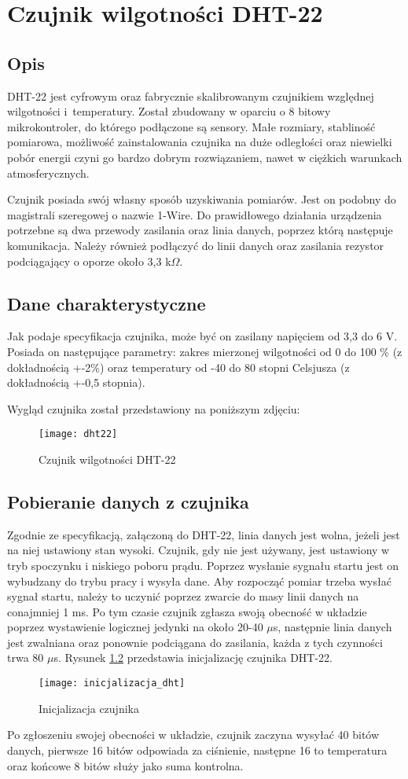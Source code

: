 \chapter{Czujnik wilgotności DHT-22}
\section*{Opis}
DHT-22 jest cyfrowym oraz fabrycznie skalibrowanym czujnikiem względnej wilgotności i~temperatury. Został zbudowany w oparciu o 8 bitowy mikrokontroler, do którego podłączone są sensory. Małe rozmiary, stabliność pomiarowa, możliwość zainstalowania czujnika na duże odległości oraz niewielki pobór energii czyni go bardzo dobrym rozwiązaniem, nawet w ciężkich warunkach atmosferycznych.

Czujnik posiada swój własny sposób uzyskiwania pomiarów. Jest on podobny do magistrali szeregowej o nazwie 1-Wire. Do prawidłowego działania urządzenia potrzebne są dwa przewody zasilania oraz linia danych, poprzez którą następuje komunikacja. Należy również podłączyć do linii danych oraz zasilania rezystor podciągający o oporze około 3,3 k$\Omega$.
\section*{Dane charakterystyczne}
Jak podaje specyfikacja czujnika, może być on zasilany napięciem od 3,3 do 6 V. Posiada on następujące parametry: zakres mierzonej wilgotności od 0 do 100 \% (z dokładnością +-2\%) oraz temperatury od -40 do 80 stopni Celsjusza (z dokładnością +-0,5 stopnia).

Wygląd czujnika został przedstawiony na poniższym zdjęciu:
\begin{figure}[h]
\centering
\texttt{[image: dht22]}
\caption{Czujnik wilgotności DHT-22}
\label{fig:dht22}
\end{figure}
\section*{Pobieranie danych z czujnika}
Zgodnie ze specyfikacją, załączoną do DHT-22, linia danych jest wolna, jeżeli jest na niej ustawiony stan wysoki. Czujnik, gdy nie jest używany, jest ustawiony w tryb spoczynku i niskiego poboru prądu. Poprzez wysłanie sygnału startu jest on wybudzany do trybu pracy i wysyła dane. Aby rozpocząć pomiar trzeba wysłać sygnał startu, należy to uczynić poprzez zwarcie do masy linii danych na conajmniej 1 ms. Po tym czasie czujnik zgłasza swoją obecność w układzie poprzez wystawienie logicznej jedynki na około 20-40 $\mu$s, następnie linia danych jest zwalniana oraz ponownie podciągana do zasilania, każda z tych czynności trwa 80 $\mu$s. Rysunek \ref{fig:inicjalizacja_dht} przedstawia inicjalizację czujnika DHT-22.
\begin{figure}[h]
\centering
\texttt{[image: inicjalizacja\_dht]}
\caption{Inicjalizacja czujnika}
\label{fig:inicjalizacja_dht}
\end{figure}
Po zgłoszeniu swojej obecności w układzie, czujnik zaczyna wysyłać 40 bitów danych, pierwsze 16 bitów odpowiada za ciśnienie, następne 16 to temperatura oraz końcowe 8 bitów służy jako suma kontrolna.

